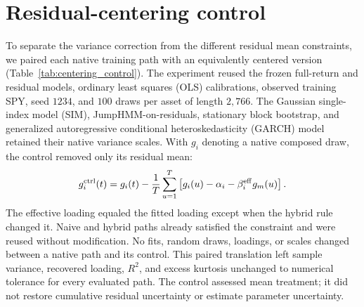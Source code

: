 \begin{table}[H]
  \centering
  \caption{\textbf{Episode incidence and breadth of the temporal
    change in the multi-asset jump comparison.} SPY paths with an
    episode are counted over the $1{,}000$ jump-enabled market
    replications per window. Asset paths with an episode is the mean
    jump-active share across the enabled asset generators. The last
    two columns give the share of assets whose mean absolute-return
    autocorrelation error through lag $25$ fell under corrected
    composition when jumps were enabled in the market only, or in the
    market and the assets, relative to jumps disabled.}
  \label{tab:jump_ablation_episodes}
  \footnotesize
  \setlength{\tabcolsep}{4pt}
  \resizebox{\textwidth}{!}{}
\end{table}


\clearpage
\section{Residual-centering control}
\label{sec:supp-centering-control}

To separate the variance correction from the different residual mean
constraints, we paired each native training path with an equivalently
centered version (Table~\ref{tab:centering_control}). The experiment
reused the frozen full-return and residual models, ordinary least
squares (OLS) calibrations, observed training SPY, seed $1234$, and
$100$ draws per asset of length $2{,}766$. The Gaussian single-index
model (SIM), JumpHMM-on-residuals, stationary block bootstrap, and
generalized autoregressive conditional heteroskedasticity (GARCH)
model retained their native variance scales. With $g_i$ denoting a
native composed draw, the control removed only its residual mean:
\begin{equation}
  g_i^{\mathrm{ctrl}}(t)
  = g_i(t)-\frac{1}{T}\sum_{u=1}^{T}
    \left[g_i(u)-\alpha_i-\beta_i^{\mathrm{eff}}g_m(u)\right].
  \label{eq:supp-centering-control}
\end{equation}
The effective loading equaled the fitted loading except when the
hybrid rule changed it. Naive and hybrid paths already satisfied the
constraint and were reused without modification. No fits, random
draws, loadings, or scales changed between a native path and its
control. This paired translation left sample variance, recovered
loading, $R^2$, and excess kurtosis unchanged to numerical tolerance
for every evaluated path. The control assessed mean treatment; it did
not restore cumulative residual uncertainty or estimate parameter
uncertainty.

